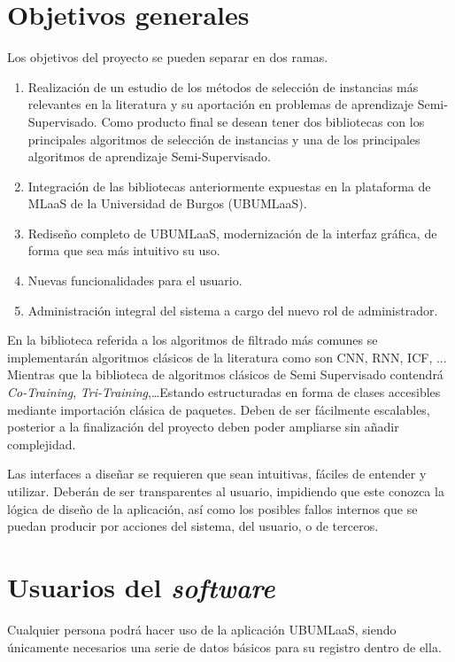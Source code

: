 \section{Objetivos generales}\label{objetivos-generales}
Los objetivos del proyecto se pueden separar en dos ramas.
\begin{enumerate}
\item Realización de un estudio de los métodos de selección de instancias más relevantes en la literatura y su aportación en problemas de aprendizaje Semi-Supervisado. Como producto final se desean tener dos bibliotecas con los principales algoritmos de selección de instancias y una de los principales algoritmos de aprendizaje Semi-Supervisado.
\item Integración de las bibliotecas anteriormente expuestas en la plataforma de MLaaS de la Universidad de Burgos (UBUMLaaS).
\item Rediseño completo de UBUMLaaS, modernización de la interfaz gráfica, de forma que sea más intuitivo su uso.
\item Nuevas funcionalidades para el usuario.
\item Administración integral del sistema a cargo del nuevo rol de administrador.
\end{enumerate}

En la biblioteca referida a los algoritmos de filtrado más comunes se implementarán algoritmos clásicos de la literatura como son CNN, RNN, ICF, ... Mientras que la biblioteca de algoritmos clásicos de Semi Supervisado contendrá \textit{Co-Training}, \textit{Tri-Training},\dots Estando estructuradas en forma de clases accesibles mediante importación clásica de paquetes. Deben de ser fácilmente escalables, posterior a la finalización del proyecto deben poder ampliarse sin añadir complejidad.

Las interfaces a diseñar se requieren que sean intuitivas, fáciles de entender y utilizar. Deberán de ser transparentes al usuario, impidiendo que este conozca la lógica de diseño de la aplicación, así como los posibles fallos internos que se puedan producir por acciones del sistema, del usuario, o de terceros.


\section{Usuarios del \textit{software}}\label{usuarios-participantes-software}
Cualquier persona podrá hacer uso de la aplicación UBUMLaaS, siendo únicamente necesarios una serie de datos básicos para su registro dentro de ella. 

